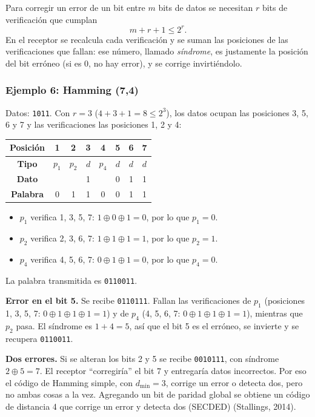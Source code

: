 \documentclass[12pt,letterpaper]{article}
\newcommand{\bits}[1]{\texttt{#1}}
\begin{document}
Para corregir un error de un bit entre $m$ bits de datos se necesitan $r$ bits de verificación que cumplan
\[ m + r + 1 \le 2^r. \]
En el receptor se recalcula cada verificación y se suman las posiciones de las verificaciones que fallan: ese número, llamado \emph{síndrome}, es justamente la posición del bit erróneo (si es 0, no hay error), y se corrige invirtiéndolo.

\subsubsection*{Ejemplo 6: Hamming (7,4)}
Datos: \bits{1011}. Con $r=3$ ($4+3+1 = 8 \le 2^3$), los datos ocupan las posiciones 3, 5, 6 y 7 y las verificaciones las posiciones 1, 2 y 4:
\begin{center}
\small
\begin{tabular}{|c|c|c|c|c|c|c|c|}
\hline
\textbf{Posición} & 1 & 2 & 3 & 4 & 5 & 6 & 7\\ \hline
\textbf{Tipo} & $p_1$ & $p_2$ & $d$ & $p_4$ & $d$ & $d$ & $d$\\ \hline
\textbf{Dato} & & & 1 & & 0 & 1 & 1\\ \hline
\textbf{Palabra} & 0 & 1 & 1 & 0 & 0 & 1 & 1\\ \hline
\end{tabular}
\end{center}
\begin{itemize}[itemsep=2pt]
\item $p_1$ verifica 1, 3, 5, 7: $1 \oplus 0 \oplus 1 = 0$, por lo que $p_1 = 0$.
\item $p_2$ verifica 2, 3, 6, 7: $1 \oplus 1 \oplus 1 = 1$, por lo que $p_2 = 1$.
\item $p_4$ verifica 4, 5, 6, 7: $0 \oplus 1 \oplus 1 = 0$, por lo que $p_4 = 0$.
\end{itemize}
La palabra transmitida es \bits{0110011}.

\textbf{Error en el bit 5.} Se recibe \bits{0110111}. Fallan las verificaciones de $p_1$ (posiciones 1, 3, 5, 7: $0\oplus1\oplus1\oplus1 = 1$) y de $p_4$ (4, 5, 6, 7: $0\oplus1\oplus1\oplus1 = 1$), mientras que $p_2$ pasa. El síndrome es $1 + 4 = 5$, así que el bit 5 es el erróneo, se invierte y se recupera \bits{0110011}.

\textbf{Dos errores.} Si se alteran los bits 2 y 5 se recibe \bits{0010111}, con síndrome $2 \oplus 5 = 7$. El receptor ``corregiría'' el bit 7 y entregaría datos incorrectos. Por eso el código de Hamming simple, con $d_{\min} = 3$, corrige un error o detecta dos, pero no ambas cosas a la vez. Agregando un bit de paridad global se obtiene un código de distancia 4 que corrige un error y detecta dos (SECDED) (Stallings, 2014).
\end{document}
